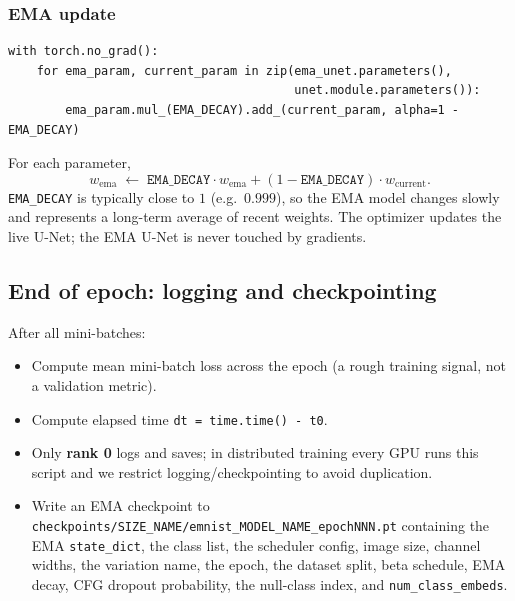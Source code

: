 \documentclass[11pt]{article}
\newcommand{\code}[1]{\texttt{#1}}
\begin{document}
\subsubsection{EMA update}

\begin{lstlisting}
with torch.no_grad():
    for ema_param, current_param in zip(ema_unet.parameters(),
                                        unet.module.parameters()):
        ema_param.mul_(EMA_DECAY).add_(current_param, alpha=1 - EMA_DECAY)
\end{lstlisting}

For each parameter,
\[
  w_{\text{ema}} \;\leftarrow\;
  \texttt{EMA\_DECAY}\cdot w_{\text{ema}} +
  (1 - \texttt{EMA\_DECAY}) \cdot w_{\text{current}}.
\]
\code{EMA\_DECAY} is typically close to $1$ (e.g.\ $0.999$), so the EMA model
changes slowly and represents a long-term average of recent weights. The
optimizer updates the live U-Net; the EMA U-Net is never touched by
gradients.

\subsection{End of epoch: logging and checkpointing}

After all mini-batches:
\begin{itemize}
  \item Compute mean mini-batch loss across the epoch (a rough training signal,
        not a validation metric).
  \item Compute elapsed time \code{dt = time.time() - t0}.
  \item Only \textbf{rank 0} logs and saves; in distributed training every GPU
        runs this script and we restrict logging/checkpointing to avoid
        duplication.
  \item Write an EMA checkpoint to
        \code{checkpoints/SIZE\_NAME/emnist\_MODEL\_NAME\_epochNNN.pt}
        containing the EMA \code{state\_dict}, the class list, the scheduler
        config, image size, channel widths, the variation name, the epoch,
        the dataset split, beta schedule, EMA decay, CFG dropout probability,
        the null-class index, and \code{num\_class\_embeds}.
\end{itemize}
\end{document}

